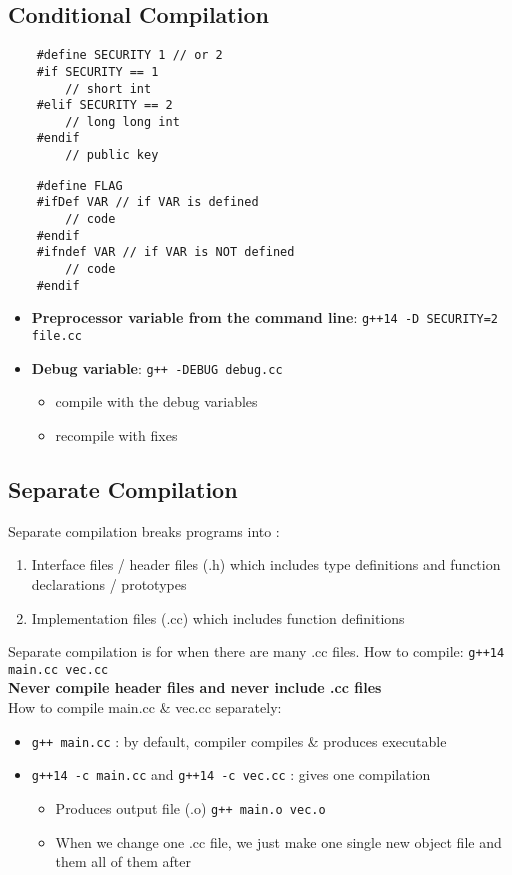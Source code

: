 \documentclass[12pt]{article}
\begin{document}
\subsection{Conditional Compilation}
\begin{lstlisting}
    #define SECURITY 1 // or 2
    #if SECURITY == 1
        // short int
    #elif SECURITY == 2
        // long long int
    #endif
        // public key
\end{lstlisting}
\begin{lstlisting}
    #define FLAG
    #ifDef VAR // if VAR is defined
        // code
    #endif
    #ifndef VAR // if VAR is NOT defined
        // code
    #endif
\end{lstlisting}
\begin{itemize}
    \item \textbf{Preprocessor variable from the command line}: \lstinline{g++14 -D SECURITY=2 file.cc}
    \item \textbf{Debug variable}: \lstinline{g++ -DEBUG debug.cc}
    \begin{itemize}
        \item compile with the debug variables
        \item recompile with fixes
    \end{itemize}
\end{itemize}

\subsection{Separate Compilation}
Separate compilation breaks programs into :
\begin{enumerate}
    \item Interface files / header files (.h) which includes type definitions and function declarations / prototypes
    \item Implementation files (.cc) which includes function definitions
\end{enumerate}
Separate compilation is for when there are many .cc files.
How to compile: \lstinline{g++14 main.cc vec.cc} \\
\textbf{Never compile header files and never include .cc files}
\\ How to compile main.cc \& vec.cc separately: 
\begin{itemize}
    \item \lstinline{g++ main.cc} : by default, compiler compiles \& produces executable
    \item \lstinline{g++14 -c main.cc} and \lstinline{g++14 -c vec.cc} : gives one compilation
    \begin{itemize}
        \item Produces output file (.o)  \lstinline{g++ main.o vec.o}
        \item When we change one .cc file, we just make one single new object file and them all of them after
    \end{itemize}
\end{itemize}
\end{document}

